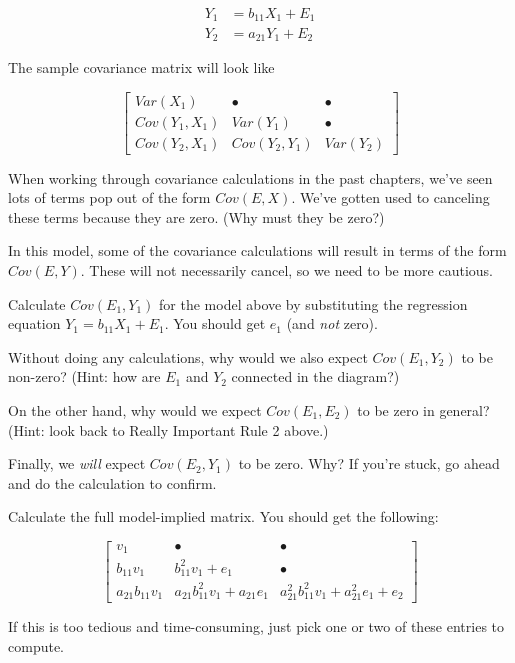\documentclass[
]{book}
\begin{document}
\begin{align}
Y_{1} &= b_{11}X_{1} + E_{1}        \\
Y_{2} &= a_{21}Y_{1} + E_{2}
\end{align}

The sample covariance matrix will look like

\[
\begin{bmatrix}
Var(X_{1})          &   \bullet             &   \bullet \\
Cov(Y_{1}, X_{1})   &   Var(Y_{1})          &   \bullet \\
Cov(Y_{2}, X_{1})   &   Cov(Y_{2}, Y_{1})   &   Var(Y_{2})
\end{bmatrix}
\]

When working through covariance calculations in the past chapters, we've seen lots of terms pop out of the form \(Cov(E, X)\). We've gotten used to canceling these terms because they are zero. (Why must they be zero?)

In this model, some of the covariance calculations will result in terms of the form \(Cov(E, Y)\). These will not necessarily cancel, so we need to be more cautious.

Calculate \(Cov(E_{1}, Y_{1})\) for the model above by substituting the regression equation \(Y_{1} = b_{11}X_{1} + E_{1}\). You should get \(e_{1}\) (and \emph{not} zero).

Without doing any calculations, why would we also expect \(Cov(E_{1}, Y_{2})\) to be non-zero? (Hint: how are \(E_{1}\) and \(Y_{2}\) connected in the diagram?)

On the other hand, why would we expect \(Cov(E_{1}, E_{2})\) to be zero in general? (Hint: look back to Really Important Rule 2 above.)

Finally, we \emph{will} expect \(Cov(E_{2}, Y_{1})\) to be zero. Why? If you're stuck, go ahead and do the calculation to confirm.

Calculate the full model-implied matrix. You should get the following:

\[
\begin{bmatrix}
v_{1}   &   \bullet &  \bullet  \\
b_{11}v_{1}  &   b_{11}^{2}v_{1} + e_{1}   &  \bullet \\
a_{21}b_{11}v_{1}  &  a_{21}b_{11}^{2}v_{1} + a_{21}e_{1}  &   a_{21}^{2}b_{11}^{2}v_{1} + a_{21}^2e_{1} + e_{2}
\end{bmatrix}
\]

If this is too tedious and time-consuming, just pick one or two of these entries to compute.
\end{document}
